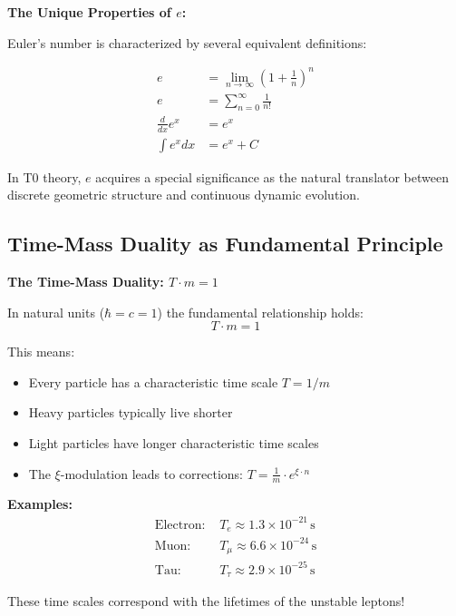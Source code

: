\documentclass[12pt,a4paper]{article}
\newcommand{\xipar}{\xi}
\begin{document}
	\begin{relation}
		\textbf{The Unique Properties of $e$:}
		
		Euler's number is characterized by several equivalent definitions:
		
		\begin{align}
			e &= \lim_{n \to \infty} \left(1 + \frac{1}{n}\right)^n \\
			e &= \sum_{n=0}^{\infty} \frac{1}{n!} \\
			\frac{d}{dx}e^x &= e^x \\
			\int e^x dx &= e^x + C
		\end{align}
		
		In T0 theory, $e$ acquires a special significance as the natural translator between discrete geometric structure and continuous dynamic evolution.
	\end{relation}
	
	\subsection{Time-Mass Duality as Fundamental Principle}
	
	\begin{insight}
		\textbf{The Time-Mass Duality: $T \cdot m = 1$}
		
		In natural units ($\hbar = c = 1$) the fundamental relationship holds:
		\begin{equation}
			\boxed{T \cdot m = 1}
		\end{equation}
		
		This means:
		\begin{itemize}
			\item Every particle has a characteristic time scale $T = 1/m$
			\item Heavy particles typically live shorter
			\item Light particles have longer characteristic time scales
			\item The $\xi$-modulation leads to corrections: $T = \frac{1}{m} \cdot e^{\xipar \cdot n}$
		\end{itemize}
		
		\textbf{Examples:}
		\begin{align}
			\text{Electron: } & T_e \approx 1.3 \times 10^{-21}\, \text{s} \\
			\text{Muon: } & T_\mu \approx 6.6 \times 10^{-24}\, \text{s} \\
			\text{Tau: } & T_\tau \approx 2.9 \times 10^{-25}\, \text{s}
		\end{align}
		
		These time scales correspond with the lifetimes of the unstable leptons!
	\end{insight}
	
\end{document}
